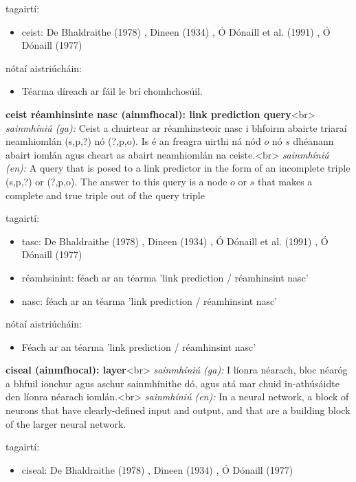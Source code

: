 \documentclass{article}
\begin{document}
tagairtí:
\begin{itemize}
	\item ceist: De Bhaldraithe (1978) \cite{de-bhaldraithe}, Dineen (1934) \cite{dineen}, Ó Dónaill et al. (1991) \cite{focloir-beag}, Ó Dónaill (1977) \cite{odonaill}
\end{itemize}

nótaí aistriúcháin:
\begin{itemize}
	\item Téarma díreach ar fáil le brí chomhchosúil.
\end{itemize}


\textbf{ceist réamhinsinte nasc (ainmfhocal): link prediction query}<br>
\textit{sainmhíniú (ga):} Ceist a chuirtear ar réamhinsteoir nasc i bhfoirm abairte triaraí neamhiomlán (s,p,?) nó (?,p,o). Is é an freagra uirthi ná nód $o$ nó $s$ dhéanann abairt iomlán agus cheart as abairt neamhiomlán na ceiste.<br>
\textit{sainmhíniú (en):} A query that is posed to a link predictor in the form of an incomplete triple (s,p,?) or (?,p,o). The answer to this query is a node $o$ or $s$ that makes a complete and true triple out of the query triple

tagairtí:
\begin{itemize}
	\item tasc: De Bhaldraithe (1978) \cite{de-bhaldraithe}, Dineen (1934) \cite{dineen}, Ó Dónaill et al. (1991) \cite{focloir-beag}, Ó Dónaill (1977) \cite{odonaill}
	\item réamhsinint: féach ar an téarma 'link prediction / réamhinsint nasc'
	\item nasc: féach ar an téarma 'link prediction / réamhinsint nasc'
\end{itemize}

nótaí aistriúcháin:
\begin{itemize}
	\item Féach ar an téarma 'link prediction / réamhinsint nasc'
\end{itemize}


\textbf{ciseal (ainmfhocal): layer}<br>
\textit{sainmhíniú (ga):} I líonra néarach, bloc néaróg a bhfuil ionchur agus aschur sainmhínithe dó, agus atá mar chuid in-athúsáidte den líonra néarach iomlán.<br>
\textit{sainmhíniú (en):} In a neural network, a block of neurons that have clearly-defined input and output, and that are a building block of the larger neural network.

tagairtí:
\begin{itemize}
	\item ciseal: De Bhaldraithe (1978) \cite{de-bhaldraithe}, Dineen (1934) \cite{dineen}, Ó Dónaill (1977) \cite{odonaill}
\end{itemize}
\end{document}
